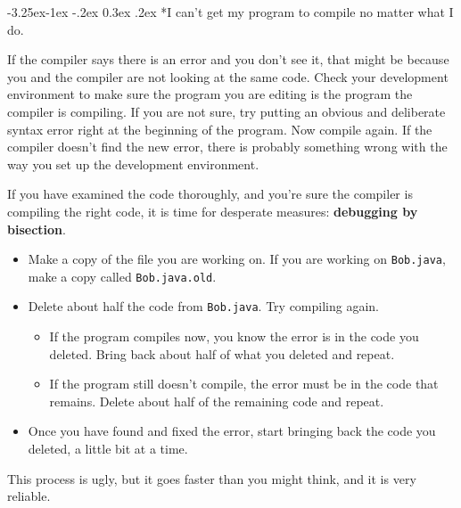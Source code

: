 \documentclass[12pt]{book}
\makeatletter
\theoremstyle{exercise}
\renewcommand\subsection{\@startsection{subsection}{2}{\z@}%
    {-3.25ex\@plus -1ex \@minus -.2ex}%
    {0.3ex \@plus .2ex}%
    {\normalfont\large\bfseries}}
\makeatother
\begin{document}
\subsection*{I can't get my program to compile no matter
what I do.}

If the compiler says there is an error and you don't see it, that might be because you and the compiler are not looking at the same code.
Check your development environment to make sure the program you are editing is the program the compiler is compiling.
If you are not sure, try putting an obvious and deliberate syntax error right at the beginning of the program.
Now compile again.
If the compiler doesn't find the new error, there is probably something
wrong with the way you set up the development environment.

If you have examined the code thoroughly, and you're sure the compiler is compiling the right code, it is time for desperate measures:
{\bf debugging by bisection}.

\begin{itemize}

\item Make a copy of the file you are working on.  If you are
working on {\tt Bob.java}, make a copy called {\tt Bob.java.old}.

\item Delete about half the code from {\tt Bob.java}.  Try compiling
again.

\begin{itemize}

\item If the program compiles now, you know the error is in the code you deleted.
Bring back about half of what you deleted and repeat.

\item If the program still doesn't compile, the error must be in the code that remains.
Delete about half of the remaining code and repeat.

\end{itemize}

\item Once you have found and fixed the error, start bringing back the code you deleted, a little bit at a time.

\end{itemize}

This process is ugly, but it goes faster than you might think, and it is very reliable.
\end{document}
